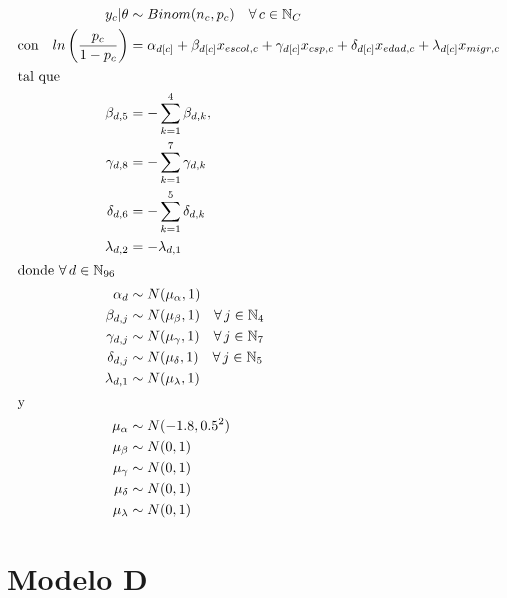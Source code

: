 \begin{align}\label{eq:Modelo_Comp_C}
y_c|\theta & \sim Binom(n_c,p_c) \quad \forall \, c \in \mathbb{N}_C \nonumber \\
\text{con} \quad ln\left(\dfrac{p_c}{1-p_c}\right) &= \alpha_{d[c]} + \beta_{d[c]} x_{escol,c} + \gamma_{d[c]} x_{csp,c} + \delta_{d[c]} x_{edad,c} + \lambda_{d[c]} x_{migr,c} \\ 
\intertext{tal que} 
\beta_{d,5} &= -\sum\limits_{k = 1}^{4} \beta_{d,k}, \nonumber \\
\gamma_{d,8} &= -\sum\limits_{k = 1}^{7} \gamma_{d,k} \nonumber \\
\delta_{d,6} &= -\sum\limits_{k = 1}^{5} \delta_{d,k} \nonumber \\
\lambda_{d,2} &= -\lambda_{d,1} \nonumber \\
\intertext{donde $\forall \, d \in \mathbb{N}_{96}$}
\alpha_d & \sim N(\mu_{\alpha}, 1) \quad  \nonumber \\
\beta_{d,j} & \sim N(\mu_{\beta}, 1) \quad \forall \, j \in \mathbb{N}_{4} \nonumber \\
\gamma_{d,j} & \sim N(\mu_{\gamma}, 1) \quad \forall \, j \in \mathbb{N}_{7} \nonumber \\
\delta_{d,j} & \sim N(\mu_{\delta}, 1) \quad \forall \, j \in \mathbb{N}_{5} \nonumber \\
\lambda_{d,1} & \sim N(\mu_{\lambda}, 1) \nonumber \\
\intertext{y}
\mu_{\alpha} &\sim N(-1.8,0.5^2) \nonumber \\
\mu_{\beta} &\sim N(0,1) \nonumber \\
\mu_{\gamma} &\sim N(0,1) \nonumber \\
\mu_{\delta} &\sim N(0,1) \nonumber \\
\mu_{\lambda} &\sim N(0,1) \nonumber
\end{align}

\section*{Modelo D}

